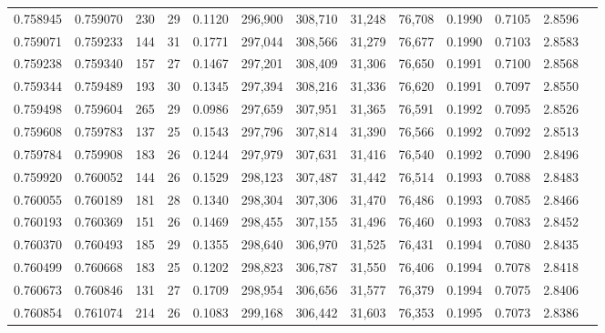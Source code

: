 \begin{tabular}{rrrrrrrrrrrrr}
0.758945 & 0.759070 &   230 &  29 &                                     0.1120 & 296,900 & 308,710 &  31,248 &  76,708 & 0.1990 & 0.7105 & 2.8596 \\
0.759071 & 0.759233 &   144 &  31 &                                     0.1771 & 297,044 & 308,566 &  31,279 &  76,677 & 0.1990 & 0.7103 & 2.8583 \\
0.759238 & 0.759340 &   157 &  27 &                                     0.1467 & 297,201 & 308,409 &  31,306 &  76,650 & 0.1991 & 0.7100 & 2.8568 \\
0.759344 & 0.759489 &   193 &  30 &                                     0.1345 & 297,394 & 308,216 &  31,336 &  76,620 & 0.1991 & 0.7097 & 2.8550 \\
0.759498 & 0.759604 &   265 &  29 &                                     0.0986 & 297,659 & 307,951 &  31,365 &  76,591 & 0.1992 & 0.7095 & 2.8526 \\
0.759608 & 0.759783 &   137 &  25 &                                     0.1543 & 297,796 & 307,814 &  31,390 &  76,566 & 0.1992 & 0.7092 & 2.8513 \\
0.759784 & 0.759908 &   183 &  26 &                                     0.1244 & 297,979 & 307,631 &  31,416 &  76,540 & 0.1992 & 0.7090 & 2.8496 \\
0.759920 & 0.760052 &   144 &  26 &                                     0.1529 & 298,123 & 307,487 &  31,442 &  76,514 & 0.1993 & 0.7088 & 2.8483 \\
0.760055 & 0.760189 &   181 &  28 &                                     0.1340 & 298,304 & 307,306 &  31,470 &  76,486 & 0.1993 & 0.7085 & 2.8466 \\
0.760193 & 0.760369 &   151 &  26 &                                     0.1469 & 298,455 & 307,155 &  31,496 &  76,460 & 0.1993 & 0.7083 & 2.8452 \\
0.760370 & 0.760493 &   185 &  29 &                                     0.1355 & 298,640 & 306,970 &  31,525 &  76,431 & 0.1994 & 0.7080 & 2.8435 \\
0.760499 & 0.760668 &   183 &  25 &                                     0.1202 & 298,823 & 306,787 &  31,550 &  76,406 & 0.1994 & 0.7078 & 2.8418 \\
0.760673 & 0.760846 &   131 &  27 &                                     0.1709 & 298,954 & 306,656 &  31,577 &  76,379 & 0.1994 & 0.7075 & 2.8406 \\
0.760854 & 0.761074 &   214 &  26 &                                     0.1083 & 299,168 & 306,442 &  31,603 &  76,353 & 0.1995 & 0.7073 & 2.8386 \\

\end{tabular}
